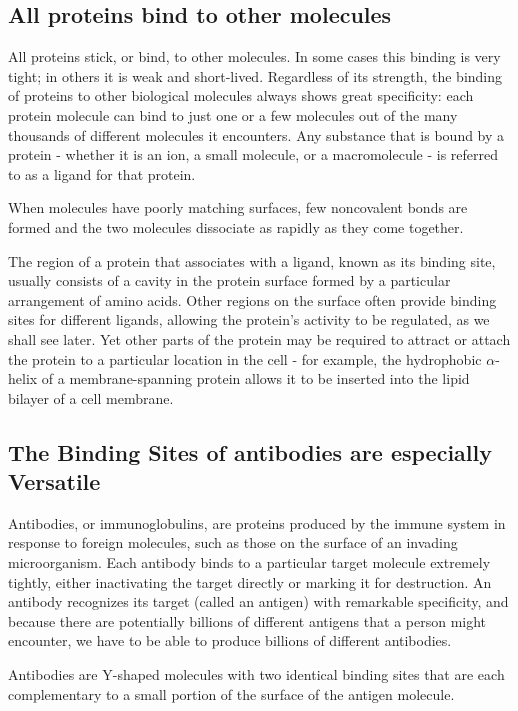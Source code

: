 \subsection{All proteins bind to other molecules}

All proteins stick, or bind, to other molecules. In some cases this binding is
very tight; in others it is weak and short-lived.
Regardless of its strength, the binding
of proteins to other biological molecules always shows great specificity:
each protein molecule can bind to just one or a few molecules out of
the many thousands of different molecules it encounters. Any substance
that is bound by a protein - whether it is an ion, a small molecule, or a
macromolecule - is referred to as a ligand for that protein.

When molecules have poorly matching surfaces, few noncovalent bonds
are formed and the two molecules dissociate as rapidly as they come
together.

The region of a protein that associates with a ligand, known as its binding site,
usually consists of a cavity in the protein surface formed by a
particular arrangement of amino acids. Other regions on the surface often provide
binding sites for different ligands, allowing the protein’s
activity to be regulated, as we shall see later. Yet other parts of the protein
may be required to attract or attach the protein to a particular location in
the cell - for example, the hydrophobic $\alpha$-helix of a membrane-spanning
protein allows it to be inserted into the lipid bilayer of a cell membrane.

\subsection{The Binding Sites of antibodies are especially Versatile}

Antibodies, or immunoglobulins, are proteins produced by the immune
system in response to foreign molecules, such as those on the surface
of an invading microorganism. Each antibody binds to a particular target
molecule extremely tightly, either inactivating the target directly or
marking it for destruction. An antibody recognizes its target (called an
antigen) with remarkable specificity, and because there are potentially
billions of different antigens that a person might encounter, we have to
be able to produce billions of different antibodies.

Antibodies are Y-shaped molecules with two identical binding sites that
are each complementary to a small portion of the surface of the antigen
molecule.

